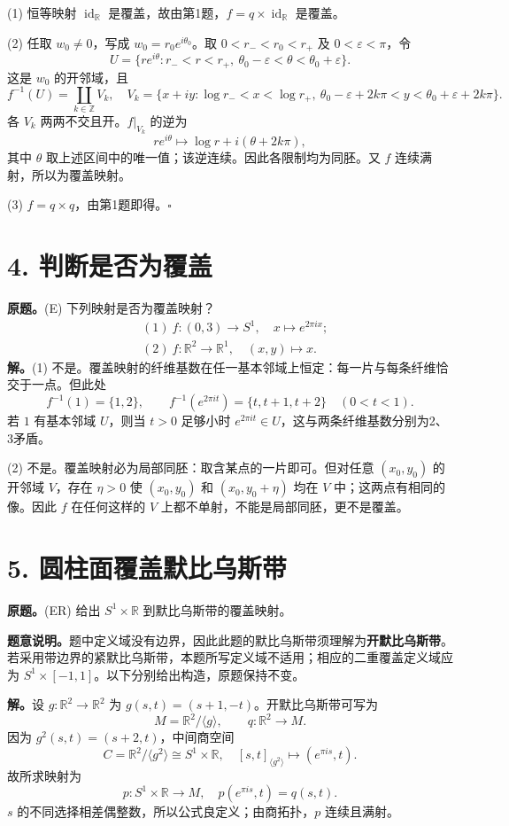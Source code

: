 \documentclass[UTF8,11pt,a4paper]{ctexart}
\newcommand{\R}{\mathbb R}\newcommand{\Z}{\mathbb Z}\newcommand{\C}{\mathbb C}
\begin{document}
(1) 恒等映射 $\operatorname{id}_{\R}$ 是覆盖，故由第1题，$f=q\times\operatorname{id}_{\R}$ 是覆盖。

(2) 任取 $w_0\ne0$，写成 $w_0=r_0e^{i\theta_0}$。取 $0<r_-<r_0<r_+$ 及 $0<\varepsilon<\pi$，令
\[U=\{re^{i\theta}:r_-<r<r_+,\ \theta_0-\varepsilon<\theta<\theta_0+\varepsilon\}.\]
这是 $w_0$ 的开邻域，且
\[f^{-1}(U)=\coprod_{k\in\Z}V_k,\quad
V_k=\{x+iy:\log r_-<x<\log r_+,\ \theta_0-\varepsilon+2k\pi<y<\theta_0+\varepsilon+2k\pi\}.\]
各 $V_k$ 两两不交且开。$f|_{V_k}$ 的逆为
\[re^{i\theta}\longmapsto\log r+i(\theta+2k\pi),\]
其中 $\theta$ 取上述区间中的唯一值；该逆连续。因此各限制均为同胚。又 $f$ 连续满射，所以为覆盖映射。

(3) $f=q\times q$，由第1题即得。\hfill$\square$

\section*{4. 判断是否为覆盖}
\textbf{原题。}(E) 下列映射是否为覆盖映射？
\begin{align*}
&(1)\ f:(0,3)\to S^1,\quad x\mapsto e^{2\pi ix};\\
&(2)\ f:\R^2\to\R^1,\quad (x,y)\mapsto x.
\end{align*}
\textbf{解。}(1) 不是。覆盖映射的纤维基数在任一基本邻域上恒定：每一片与每条纤维恰交于一点。但此处
\[f^{-1}(1)=\{1,2\},\qquad
f^{-1}(e^{2\pi it})=\{t,t+1,t+2\}\quad(0<t<1).\]
若 $1$ 有基本邻域 $U$，则当 $t>0$ 足够小时 $e^{2\pi it}\in U$，这与两条纤维基数分别为2、3矛盾。

(2) 不是。覆盖映射必为局部同胚：取含某点的一片即可。但对任意 $(x_0,y_0)$ 的开邻域 $V$，存在 $\eta>0$ 使 $(x_0,y_0)$ 和 $(x_0,y_0+\eta)$ 均在 $V$ 中；这两点有相同的像。因此 $f$ 在任何这样的 $V$ 上都不单射，不能是局部同胚，更不是覆盖。

\section*{5. 圆柱面覆盖默比乌斯带}
\textbf{原题。}(ER) 给出 $S^1\times\R$ 到默比乌斯带的覆盖映射。

\textbf{题意说明。}题中定义域没有边界，因此此题的默比乌斯带须理解为\textbf{开默比乌斯带}。若采用带边界的紧默比乌斯带，本题所写定义域不适用；相应的二重覆盖定义域应为 $S^1\times[-1,1]$。以下分别给出构造，原题保持不变。

\textbf{解。}设 $g:\R^2\to\R^2$ 为 $g(s,t)=(s+1,-t)$。开默比乌斯带可写为
\[M=\R^2/\langle g\rangle,\qquad q:\R^2\to M.\]
因为 $g^2(s,t)=(s+2,t)$，中间商空间
\[C=\R^2/\langle g^2\rangle\cong S^1\times\R,\quad
[s,t]_{\langle g^2\rangle}\longmapsto(e^{\pi is},t).
\]
故所求映射为
\[\boxed{\ p:S^1\times\R\longrightarrow M,\quad p(e^{\pi is},t)=q(s,t).\ }\]
$s$ 的不同选择相差偶整数，所以公式良定义；由商拓扑，$p$ 连续且满射。
\end{document}
